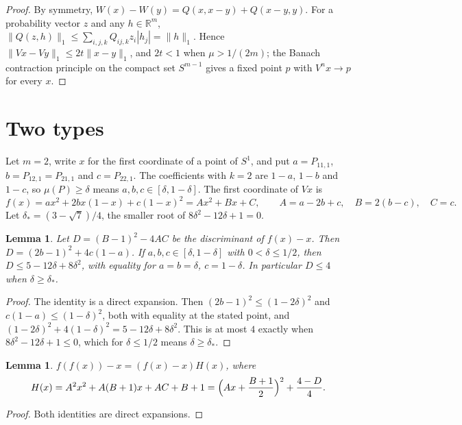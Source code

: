 \documentclass[11pt]{amsart}
\newtheorem{lemma}[theorem]{Lemma}
\theoremstyle{definition}
\theoremstyle{remark}
\newcommand{\R}{\mathbb{R}}
\begin{document}
\begin{proof}
By symmetry, $W(x)-W(y)=Q(x,x-y)+Q(x-y,y)$. For a probability vector $z$ and any $h\in\R^m$,
$\|Q(z,h)\|_1\le\sum_{i,j,k}Q_{ij,k}z_i|h_j|=\|h\|_1$. Hence $\|Vx-Vy\|_1\le2t\|x-y\|_1$, and $2t<1$ when
$\mu>1/(2m)$; the Banach contraction principle on the compact set $S^{m-1}$ gives a fixed point $p$ with $V^nx\to p$ for
every $x$.
\end{proof}

\section{Two types}\label{sec:binary}

Let $m=2$, write $x$ for the first coordinate of a point of $S^1$, and put $a=P_{11,1}$, $b=P_{12,1}=P_{21,1}$ and
$c=P_{22,1}$. The coefficients with $k=2$ are $1-a$, $1-b$ and $1-c$, so $\mu(P)\ge\delta$ means
$a,b,c\in[\delta,1-\delta]$. The first coordinate of $Vx$ is
\begin{equation}\label{eq:f}
f(x)=ax^2+2bx(1-x)+c(1-x)^2=Ax^2+Bx+C,\qquad A=a-2b+c,\quad B=2(b-c),\quad C=c .
\end{equation}
Let $\delta_*=(3-\sqrt7)/4$, the smaller root of $8\delta^2-12\delta+1=0$.

\begin{lemma}\label{lem:disc}
Let $D=(B-1)^2-4AC$ be the discriminant of $f(x)-x$. Then $D=(2b-1)^2+4c(1-a)$. If $a,b,c\in[\delta,1-\delta]$ with
$0<\delta\le1/2$, then $D\le5-12\delta+8\delta^2$, with equality for $a=b=\delta$, $c=1-\delta$. In particular $D\le4$
when $\delta\ge\delta_*$.
\end{lemma}

\begin{proof}
The identity is a direct expansion. Then $(2b-1)^2\le(1-2\delta)^2$ and $c(1-a)\le(1-\delta)^2$, both with equality at
the stated point, and $(1-2\delta)^2+4(1-\delta)^2=5-12\delta+8\delta^2$. This is at most $4$ exactly when
$8\delta^2-12\delta+1\le0$, which for $\delta\le1/2$ means $\delta\ge\delta_*$.
\end{proof}

\begin{lemma}\label{lem:second}
$f(f(x))-x=(f(x)-x)H(x)$, where
\[
H(x)=A^2x^2+A(B+1)x+AC+B+1=\Bigl(Ax+\frac{B+1}{2}\Bigr)^2+\frac{4-D}{4}.
\]
\end{lemma}

\begin{proof}
Both identities are direct expansions.
\end{proof}
\end{document}

